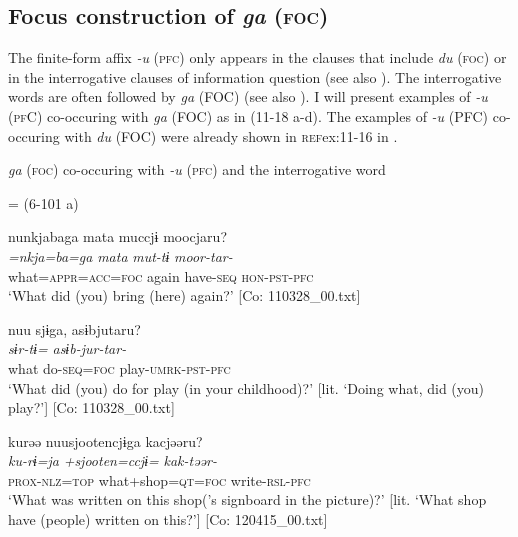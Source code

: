 \subsection{Focus construction of \textit{ga} (\textsc{foc})}\label{sec:11.3.2}

The finite-form affix \textit{{}-u} (\textsc{pfc}) only appears in the clauses that include \textit{du} (\textsc{foc}) or in the interrogative clauses of information question (see also ). The interrogative words are often followed by \textit{ga} (FOC) (see also ). I will present examples of \textit{{}-u} (\textsc{pf}C) co-occuring with \textit{ga} (FOC) as in (11-18 a-d). The examples of \textit{-u} (PFC) co-occuring with \textit{du} (FOC) were already shown in \textsc{ref}{ex:11-16} in .

\ea\label{ex:11-18}  \textit{ga} (\textsc{foc}) co-occuring with \textit{{}-u} (\textsc{pfc}) and the interrogative word

  \ea{} = (6-101 a)

    
      \glll    nunkjabaga  mata  muccjɨ  moocjaru?\\
      \textit{=nkja=ba=ga}  \textit{mata}  \textit{mut-tɨ}  \textit{moor-tar-}\\
      what=\textsc{appr}=\textsc{acc}=\textsc{foc}  again  have-\textsc{seq}  \textsc{hon}-\textsc{pst}-\textsc{pfc}\\
      \glt       ‘What did (you) bring (here) again?’ [Co: 110328\_00.txt]

  \ex  
      \glll    nuu  sjɨga,  asɨbjutaru?\\
      \textit{}  \textit{sɨr-tɨ=}  \textit{asɨb-jur-tar-}\\
      what  do-\textsc{seq}=\textsc{foc}  play-\textsc{umrk}-\textsc{pst}-\textsc{pfc}\\
      \glt       ‘What did (you) do for play (in your childhood)?’ [lit. ‘Doing what, did (you) play?’] [Co: 110328\_00.txt]

  \ex  
      \glll    kurəə  nuu{\textbar}sjooten{\textbar}cjɨga  kacjəəru?\\
      \textit{ku-rɨ=ja}  \textit{+sjooten=ccjɨ=}  \textit{kak-təər-}\\
      \textsc{prox}-\textsc{nlz}=\textsc{top}  what+shop=\textsc{qt}=\textsc{foc}  write-\textsc{rsl}-\textsc{pfc}\\
      \glt        ‘What was written on this shop(’s signboard in the picture)?’ [lit. ‘What shop have (people) written on this?’]  [Co: 120415\_00.txt]

